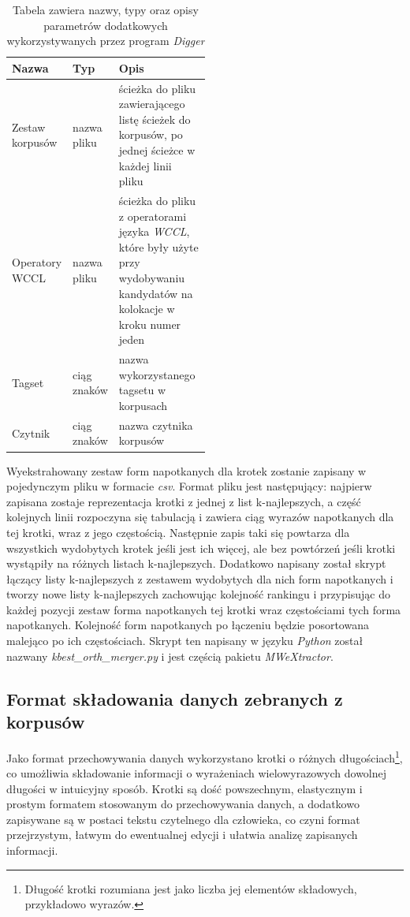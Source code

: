 \documentclass[11pt,a4paper]{llncs}
\begin{document}
\begin{table}[h!]
\centering
\begin{tabular}{l | l | p{0.5\linewidth}}
	\toprule 
	Nazwa & Typ & Opis \\
	\midrule 
	Zestaw korpusów & nazwa pliku & ścieżka do pliku zawierającego listę ścieżek do korpusów, po jednej ścieżce w każdej linii pliku \\ 
	\hline
	Operatory WCCL & nazwa pliku & ścieżka do pliku z operatorami języka \emph{WCCL}, które były użyte przy wydobywaniu kandydatów na kolokacje w kroku numer jeden\\ 
	\hline
	Tagset & ciąg znaków & nazwa wykorzystanego tagsetu w korpusach \\
	\hline
	Czytnik & ciąg znaków & nazwa czytnika korpusów\\
	\bottomrule
\end{tabular}
\caption[Parametery dodatkowe programu \emph{Digger}]{Tabela zawiera nazwy, typy oraz opisy parametrów dodatkowych wykorzystywanych przez program \emph{Digger}}
\label{digger_parameters_orths}
\end{table}

Wyekstrahowany zestaw form napotkanych dla krotek zostanie zapisany w pojedynczym pliku w formacie \emph{csv}.
Format pliku jest następujący: najpierw zapisana zostaje reprezentacja krotki z jednej z list k-najlepszych, a część kolejnych linii rozpoczyna się tabulacją i zawiera ciąg wyrazów napotkanych dla tej krotki, wraz z jego częstością.
Następnie zapis taki się powtarza dla wszystkich wydobytych krotek jeśli jest ich więcej, ale bez powtórzeń jeśli krotki wystąpiły na różnych listach k-najlepszych.
Dodatkowo napisany został skrypt łączący listy k-najlepszych z zestawem wydobytych dla nich form napotkanych i tworzy nowe listy k-najlepszych zachowując kolejność rankingu i przypisując do każdej pozycji zestaw forma napotkanych tej krotki wraz częstościami tych forma napotkanych.
Kolejność form napotkanych po łączeniu będzie posortowana malejąco po ich częstościach.
Skrypt ten napisany w języku \emph{Python} został nazwany \emph{kbest\_orth\_merger.py} i jest częścią pakietu \emph{MWeXtractor}.


\subsection{Format składowania danych zebranych z korpusów}
Jako format przechowywania danych wykorzystano krotki o różnych długościach\footnote{Długość krotki rozumiana jest jako liczba jej elementów składowych, przykładowo wyrazów.}, co umożliwia składowanie informacji o wyrażeniach wielowyrazowych dowolnej długości w intuicyjny sposób.
Krotki są dość powszechnym, elastycznym i prostym formatem stosowanym do przechowywania danych, a dodatkowo zapisywane są w postaci tekstu czytelnego dla człowieka, co czyni format przejrzystym, łatwym do ewentualnej edycji i ułatwia analizę zapisanych informacji.
\end{document}
